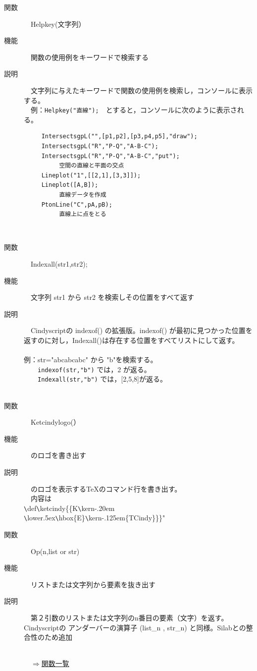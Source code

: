 \documentclass[papersize,a4paper,12pt,uplatex]{jsarticle}
\begin{document}
\begin{description}
\hypertarget{helpkey}{}
\item[関数]　Helpkey(文字列）
\item[機能]　関数の使用例をキーワードで検索する
\item[説明]　文字列に与えたキーワードで関数の使用例を検索し，コンソールに表示する。\\
　例：\verb|Helpkey("直線");|　とすると，コンソールに次のように表示される。
\begin{verbatim}
　　　IntersectsgpL("",[p1,p2],[p3,p4,p5],"draw"); 
　　　IntersectsgpL("R","P-Q","A-B-C"); 
　　　IntersectsgpL("R","P-Q","A-B-C","put");
     　　　空間の直線と平面の交点
　　　Lineplot("1",[[2,1],[3,3]]);
　　　Lineplot([A,B]);
     　　　直線データを作成
　　　PtonLine("C",pA,pB); 
     　　　直線上に点をとる
\end{verbatim}
　\\
\hypertarget{indexall}{}
\item[関数]　Indexall(str1,str2);
\item[機能]　文字列 str1 から str2 を検索しその位置をすべて返す
\item[説明]　Cindyscriptの indexof() の拡張版。indexof() が最初に見つかった位置を返すのに対し，Indexall()は存在する位置をすべてリストにして返す。\\
　\\
例：str="abcabcabc" から "b"を検索する。\\
　　\verb|indexof(str,"b")| では，2 が返る。\\
　　\verb|Indexall(str,"b")| では，[2,5,8]が返る。\\
　\\

\hypertarget{ketcindylogo}{}
\item[関数]　Ketcindylogo(）
\item[機能]　\ketcindy のロゴを書き出す
\item[説明]　\ketcindy のロゴを表示する\TeX のコマンド行を書き出す。\\
　内容は\\
\verb|\|def\verb|\|ketcindy\{\{K\verb|\|kern-.20em \verb|\|lower.5ex\verb|\|hbox\{E\}\verb|\|kern-.125em\{TCindy\}\}\}"
　\\
\hypertarget{op}{}
\item[関数]　Op(n,list or str)
\item[機能]　リストまたは文字列から要素を抜き出す
\item[説明]　第２引数のリストまたは文字列のn番目の要素（文字）を返す。\\
Cindyscriptの アンダーバーの演算子 (list\_n , str\_n) と同様。Silabとの整合性のため追加\\
　\\
\begin{flushright}　\hyperlink{functionlist}{$\Rightarrow$関数一覧}\end{flushright}
\newpage

\end{description}
\newpage
\end{document}
